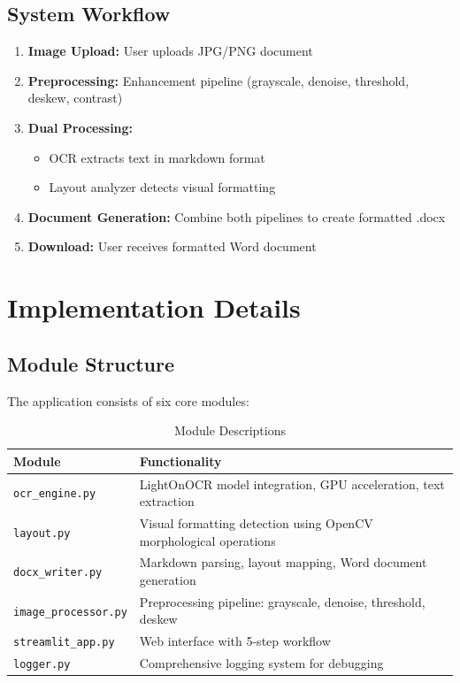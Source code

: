 \documentclass[12pt,a4paper]{article}
\begin{document}
\subsection{System Workflow}
\begin{enumerate}
    \item \textbf{Image Upload:} User uploads JPG/PNG document
    \item \textbf{Preprocessing:} Enhancement pipeline (grayscale, denoise, threshold, deskew, contrast)
    \item \textbf{Dual Processing:}
    \begin{itemize}
        \item OCR extracts text in markdown format
        \item Layout analyzer detects visual formatting
    \end{itemize}
    \item \textbf{Document Generation:} Combine both pipelines to create formatted .docx
    \item \textbf{Download:} User receives formatted Word document
\end{enumerate}

\newpage

\section{Implementation Details}

\subsection{Module Structure}
The application consists of six core modules:

\begin{table}[h]
\centering
\small
\begin{tabular}{@{}p{4cm}p{9cm}@{}}
\toprule
\textbf{Module} & \textbf{Functionality} \\ \midrule
\texttt{ocr\_engine.py} & LightOnOCR model integration, GPU acceleration, text extraction \\
\texttt{layout.py} & Visual formatting detection using OpenCV morphological operations \\
\texttt{docx\_writer.py} & Markdown parsing, layout mapping, Word document generation \\
\texttt{image\_processor.py} & Preprocessing pipeline: grayscale, denoise, threshold, deskew \\
\texttt{streamlit\_app.py} & Web interface with 5-step workflow \\
\texttt{logger.py} & Comprehensive logging system for debugging \\ \bottomrule
\end{tabular}
\caption{Module Descriptions}
\end{table}
\end{document}
